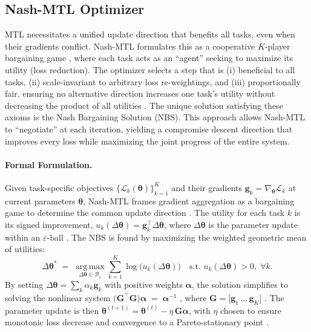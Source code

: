 \subsection{Nash-MTL Optimizer}
\label{sec:cbic:nash}

MTL necessitates a unified update direction that benefits all tasks, even when their gradients conflict. Nash-MTL formulates this as a cooperative $K$-player bargaining game \cite{nash}, where each task acts as an ``agent'' seeking to maximize its utility (loss reduction). The optimizer selects a step that is (i) beneficial to all tasks, (ii) scale-invariant to arbitrary loss re-weightings, and (iii) proportionally fair, ensuring no alternative direction increases one task's utility without decreasing the product of all utilities \cite{nash}. The unique solution satisfying these axioms is the Nash Bargaining Solution (NBS). This approach allows Nash-MTL to ``negotiate'' at each iteration, yielding a compromise descent direction that improves every loss while maximizing the joint progress of the entire system.

\paragraph*{Formal Formulation.}
Given task-specific objectives $\{\mathcal{L}_k(\boldsymbol{\theta})\}_{k=1}^{K}$ and their gradients $\mathbf{g}_k=\nabla_{\!\boldsymbol{\theta}}\mathcal{L}_k$ at current parameters $\boldsymbol{\theta}$, Nash-MTL frames gradient aggregation as a bargaining game to determine the common update direction \cite{nash}. The utility for each task $k$ is its signed improvement, $u_k(\Delta\boldsymbol{\theta})=\mathbf{g}_k^{\!\top}\!\Delta\boldsymbol{\theta}$, where $\Delta\boldsymbol{\theta}$ is the parameter update within an $\varepsilon$-ball \cite{nash}. The NBS is found by maximizing the weighted geometric mean of utilities:
\begin{equation}
\Delta\boldsymbol{\theta}^{*}\;=\;\operatorname*{arg\,max}_{\Delta\boldsymbol{\theta}\in\mathcal{B}_\varepsilon}
\sum_{k=1}^{K}\!\log\!\bigl(u_k(\Delta\boldsymbol{\theta})\bigr)
\quad\text{s.t. }u_k(\Delta\boldsymbol{\theta})>0,\;\forall k.
\label{eq:cbic:nbs}
\end{equation}
By setting $\Delta\boldsymbol{\theta}=\sum_{k}\alpha_k\mathbf{g}_k$ with positive weights $\boldsymbol{\alpha}$, the solution simplifies to solving the nonlinear system $\bigl(\mathbf{G}^{\!\top}\mathbf{G}\bigr)\boldsymbol{\alpha} \;=\; \boldsymbol{\alpha}^{-1}$ \cite{nash}, where $\mathbf{G}=\bigl[\mathbf{g}_1\,\ldots\,\mathbf{g}_K\bigr]$ \cite{nash}. The parameter update is then $\boldsymbol{\theta}^{(t+1)} =\boldsymbol{\theta}^{(t)}-\eta\,\mathbf{G}\boldsymbol{\alpha}$, with $\eta$ chosen to ensure monotonic loss decrease and convergence to a Pareto-stationary point \cite{nash}.

